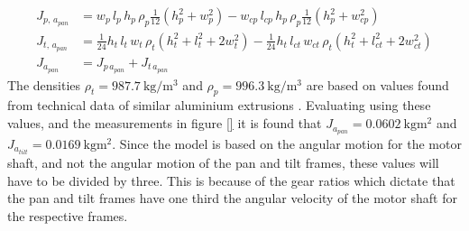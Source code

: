 \documentclass[../../main.tex]{subfiles}
\begin{document}
\begin{equation}\label{eq:pan_axis_inertia}
\begin{split}
        J_{p,\,a_{pan}} &= w_{p}\,l_{p}\,h_{p}\,\rho_{p}\frac{1}{12}(h_{p}^2+w_{p}^2)-w_{cp}\,l_{cp}\,h_{p}\,\rho_{p}\frac{1}{12}(h_{p}^2+w_{cp}^2) \\
        J_{t,\,a_{pan}} &= \frac{1}{24}h_t\,l_t\,w_t\, \rho_t (h_t^2+l_t^2+2w_t^2)-\frac{1}{24}h_t\,l_{ct}\,w_{ct}\, \rho_t (h_t^2+l_{ct}^2+2w_{ct}^2)
        \\
        J_{a_{pan}} &= J_{p\,a_{pan}} + J_{t\,a_{pan}}
\end{split}
\end{equation}
The densities $\rho_t = \SI{987.7 }{\kilo \gram \per \cubic \meter }$ and $\rho_p = \SI{996.3 }{\kilo \gram \per \cubic \meter } $ are based on values found from technical data of similar aluminium extrusions \cite{extrusion45x45} \cite{extrusion40x40}.
Evaluating using these values, and the measurements in figure \ref{} it is found that $J_{a_{pan}} = \SI{0.0602}{\kilo \gram \square \meter } $ and $J_{a_{tilt}} = \SI{0.0169}{\kilo \gram \square \meter }$. Since the model is based on the angular motion for the motor shaft, and not the angular motion of the pan and tilt frames, these values will have to be divided by three. This is because of the gear ratios which dictate that the pan and tilt frames have one third the angular velocity of the motor shaft for the respective frames.
\end{document}
